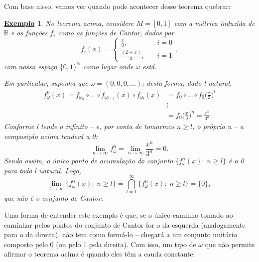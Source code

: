 \documentclass[12pt]{article}
\newtheorem{example}{\underline{Exemplo}}
\theoremstyle{definition}
\begin{document}
Com base nisso, vamos ver quando pode acontecer desse teorema quebrar:
\begin{example}
	No teorema acima, considere \(M=[0,1]\) com a métrica induzida de \(\mathbb{R}\) e as funções \(f_{i}\) como as funções de Cantor, dadas por
	\[
		f_{i}(x) = \left\{\begin{array}{ll}
			\frac{x}{3},     & \quad i=0 \\
			\frac{(2+x)}{3}, & \quad i=1
		\end{array}\right.,
	\]
	com nosso espaço \(\{0,1\}^{\mathbb{N}}\) como lugar onde \(\omega \) está.

	Em particular, suponha que \(\omega =(0,0,0,\dotsc )\); desta forma, dado l natural,
	\begin{align*}
		f_{\omega }^{n}(x)=f_{\omega_{n}}\circ \dotsc \circ f_{\omega_{l+1}}(x)\circ f_{\omega_{l}}(x) & =f_{0}\circ \dotsc \circ f_{0}\biggl(\frac{x}{3}\biggr)^{l} \\
		                                                                                               & \vdots                                                      \\
		                                                                                               & =f_{0}\biggl(\frac{x}{3}\biggr)^{n} = \frac{x^{n}}{3^{n}}.
	\end{align*}
	Conforme l tende a infinito -- e, por conta de tomarmos \(n\geq l\), o próprio n -- a composição acima tenderá a 0:
	\[
		\lim_{n\to \infty}f_{\omega}^{n} = \lim_{n\to \infty}\frac{x^{n}}{3^{n}}= 0.
	\]
	Sendo assim, o único ponto de acumulação do conjunto \(\{f_{\omega }^{n}(x):\; n\geq l\}\) é o 0 para todo l natural. Logo,
	\[
		\lim_{l\to \infty}\overline{\{f_{\omega }^{n}(x):\; n\geq l\}}=\bigcap_{l=1}^{\infty}\overline{\{f_{\omega }^{n}(x):\; n\geq l\}}=\{0\},
	\]
	que não é o conjunto de Cantor.
\end{example}
Uma forma de entender este exemplo é que, se o único caminho tomado ao caminhar pelos pontos do conjunto de Cantor for o da esquerda (analogamente para o da direita), não tem como formá-lo -- chegará a um conjunto unitário composto pelo 0 (ou pelo 1 pela direita). Com isso, um tipo de \(\omega \) que não permite afirmar o teorema acima é quando eles têm a cauda constante.
\end{document}
